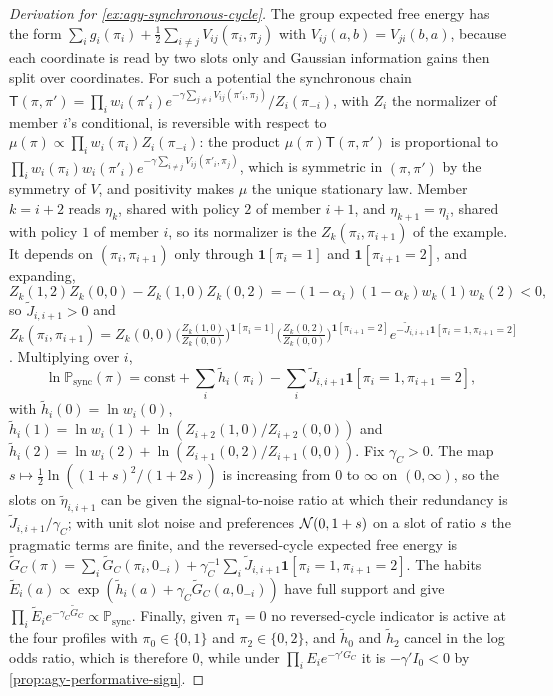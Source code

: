 \begin{proof}[Derivation for \cref{ex:agy-synchronous-cycle}]
The group expected free energy has the form $\sum_ig_i(\pi_i)+\frac12\sum_{i\ne j}V_{ij}(\pi_i,\pi_j)$ with $V_{ij}(a,b)=V_{ji}(b,a)$, because each coordinate is read by two slots only and Gaussian information gains then split over coordinates. For such a potential the synchronous chain $\mathsf T(\pi,\pi')=\prod_iw_i(\pi'_i)e^{-\gamma\sum_{j\ne i}V_{ij}(\pi'_i,\pi_j)}/Z_i(\pi_{-i})$, with $Z_i$ the normalizer of member $i$'s conditional, is reversible with respect to $\mu(\pi)\propto\prod_iw_i(\pi_i)Z_i(\pi_{-i})$: the product $\mu(\pi)\mathsf T(\pi,\pi')$ is proportional to $\prod_iw_i(\pi_i)w_i(\pi'_i)e^{-\gamma\sum_{i\ne j}V_{ij}(\pi'_i,\pi_j)}$, which is symmetric in $(\pi,\pi')$ by the symmetry of $V$, and positivity makes $\mu$ the unique stationary law. Member $k=i+2$ reads $\eta_k$, shared with policy $2$ of member $i+1$, and $\eta_{k+1}=\eta_i$, shared with policy $1$ of member $i$, so its normalizer is the $Z_k(\pi_i,\pi_{i+1})$ of the example. It depends on $(\pi_i,\pi_{i+1})$ only through $\mathbf 1[\pi_i=1]$ and $\mathbf 1[\pi_{i+1}=2]$, and expanding,
\begin{equation*}
Z_k(1,2)Z_k(0,0)-Z_k(1,0)Z_k(0,2)=-(1-\alpha_i)(1-\alpha_k)w_k(1)w_k(2)<0,
\end{equation*}
so $\tilde J_{i,i+1}>0$ and $Z_k(\pi_i,\pi_{i+1})=Z_k(0,0)\bigl(\tfrac{Z_k(1,0)}{Z_k(0,0)}\bigr)^{\mathbf 1[\pi_i=1]}\bigl(\tfrac{Z_k(0,2)}{Z_k(0,0)}\bigr)^{\mathbf 1[\pi_{i+1}=2]}e^{-\tilde J_{i,i+1}\mathbf 1[\pi_i=1,\pi_{i+1}=2]}$. Multiplying over $i$,
\begin{equation*}
\ln\mathbb P_{\mathrm{sync}}(\pi)=\mathrm{const}+\sum_i\tilde h_i(\pi_i)-\sum_i\tilde J_{i,i+1}\mathbf 1[\pi_i=1,\pi_{i+1}=2],
\end{equation*}
with $\tilde h_i(0)=\ln w_i(0)$, $\tilde h_i(1)=\ln w_i(1)+\ln(Z_{i+2}(1,0)/Z_{i+2}(0,0))$ and $\tilde h_i(2)=\ln w_i(2)+\ln(Z_{i+1}(0,2)/Z_{i+1}(0,0))$. Fix $\gamma_C>0$. The map $s\mapsto\frac12\ln((1+s)^2/(1+2s))$ is increasing from $0$ to $\infty$ on $(0,\infty)$, so the slots on $\tilde\eta_{i,i+1}$ can be given the signal-to-noise ratio at which their redundancy is $\tilde J_{i,i+1}/\gamma_C$; with unit slot noise and preferences $\mathcal{N}(0,1+s)$ on a slot of ratio $s$ the pragmatic terms are finite, and the reversed-cycle expected free energy is $\tilde G_C(\pi)=\sum_i\tilde G_C(\pi_i,0_{-i})+\gamma_C^{-1}\sum_i\tilde J_{i,i+1}\mathbf 1[\pi_i=1,\pi_{i+1}=2]$. The habits $\tilde E_i(a)\propto\exp(\tilde h_i(a)+\gamma_C\tilde G_C(a,0_{-i}))$ have full support and give $\prod_i\tilde E_ie^{-\gamma_C\tilde G_C}\propto\mathbb P_{\mathrm{sync}}$. Finally, given $\pi_1=0$ no reversed-cycle indicator is active at the four profiles with $\pi_0\in\{0,1\}$ and $\pi_2\in\{0,2\}$, and $\tilde h_0$ and $\tilde h_2$ cancel in the log odds ratio, which is therefore $0$, while under $\prod_iE_ie^{-\gamma'G_C}$ it is $-\gamma'I_0<0$ by \cref{prop:agy-performative-sign}.
\end{proof}

